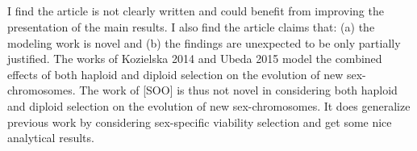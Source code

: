 \documentclass[10pt,letterpaper]{article}
\begin{document}
\noindent\subsection{}
I find the article is not clearly written and could benefit from improving the presentation of the main results. 
%
%
I also find the article claims that: (a) the modeling work is novel and (b) the findings are unexpected to be only partially justified.
%
%
The works of Kozielska 2014 and Ubeda 2015 model the combined effects of both haploid and diploid selection on the evolution of new sex-chromosomes. The work of [SOO] is thus not novel in considering both haploid and diploid selection on the evolution of new sex-chromosomes. It does generalize previous work by considering sex-specific viability selection and get some nice analytical results.
\end{document}

